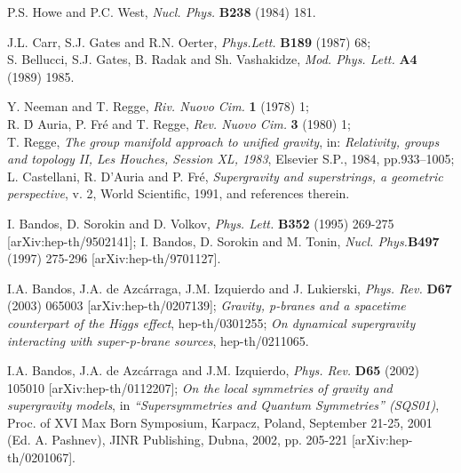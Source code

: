 \documentclass[a4paper,11pt]{article}
\begin{document}
\begin{thebibliography}{99}
P.S. Howe and P.C. West, 
{\em Nucl. Phys.} {\bf B238} (1984) 181.


J.L. Carr, S.J. Gates and R.N. Oerter, 
{\em Phys.Lett.} {\bf B189} (1987) 68; 
\\ S. Bellucci, S.J. Gates, B. Radak and Sh. Vashakidze,
{\em Mod. Phys. Lett.} {\bf A4} (1989) 1985.  


Y. Neeman and T. Regge, 
{\em Riv. Nuovo Cim.} {\bf 1} (1978) 1; 
\\ R. \'D Auria, P. Fr\'e and T. Regge, {\em Rev. Nuovo Cim.} {\bf 3} 
(1980) 1; \\  
T. Regge, {\sl The group manifold approach to unified gravity}, 
in: {\it Relativity, groups and topology II, Les Houches, Session XL, 
1983}, Elsevier S.P., 1984, pp.933--1005; \\ 
L. Castellani, R. D'Auria and  P. Fr\'e, {\sl Supergravity and
superstrings, a geometric perspective}, v. 2, World Scientific, 
1991, and references therein. 

 I. Bandos, D. Sorokin and D. Volkov,
             {\em Phys. Lett.} {\bf B352} (1995)  269-275  
[arXiv:hep-th/9502141]; 
I. Bandos, D. Sorokin and M. Tonin, 
{\em Nucl. Phys.}{\bf B497} (1997) 275-296
[arXiv:hep-th/9701127].


I.A. Bandos, J.A. de Azc\'arraga, J.M. Izquierdo and 
J. Lukierski, 
{\em Phys. Rev.} {\bf D67} (2003) 065003 [arXiv:hep-th/0207139]; 
{\sl Gravity, p-branes and a spacetime counterpart of the Higgs effect}, 
hep-th/0301255; 
{\sl On dynamical supergravity interacting with super-p-brane sources}, 
 hep-th/0211065.  

I.A. Bandos, J.A. de Azc\'arraga and J.M. Izquierdo,  
{\em Phys. Rev.} {\bf D65} (2002) 105010 [arXiv:hep-th/0112207];   
{\sl On the local symmetries of gravity and supergravity models}, 
in {\it ``Supersymmetries and Quantum Symmetries'' (SQS01)}, 
Proc. of XVI Max Born Symposium, 
Karpacz, Poland, September 21-25, 2001 (Ed. A. Pashnev),
JINR Publishing, Dubna, 2002, pp. 205-221 [arXiv:hep-th/0201067].



\end{thebibliography}
\end{document}
